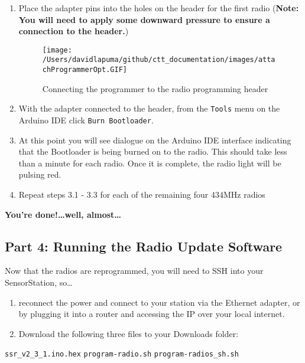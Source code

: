 \documentclass[
]{article}
\begin{document}
\begin{enumerate}
\def\labelenumi{\arabic{enumi}.}
\item
  Place the adapter pins into the holes on the header for the first
  radio (\textbf{Note: You will need to apply some downward pressure to
  ensure a connection to the header.})

  \begin{figure}
  \hypertarget{id}{%
  \centering
  \texttt{[image: /Users/davidlapuma/github/ctt\_documentation/images/attachProgrammerOpt.GIF]}
  \caption{Connecting the programmer to the radio programming
  header}\label{id}
  }
  \end{figure}
\item
  With the adapter connected to the header, from the \texttt{Tools} menu
  on the Arduino IDE click \texttt{Burn\ Bootloader}.
\item
  At this point you will see dialogue on the Arduino IDE interface
  indicating that the Bootloader is being burned on to the radio. This
  should take less than a minute for each radio. Once it is complete,
  the radio light will be pulsing red.
\item
  Repeat steps 3.1 - 3.3 for each of the remaining four 434MHz radios
\end{enumerate}

\textbf{You're done!\ldots well, almost\ldots{}}

\hypertarget{part-4-running-the-radio-update-software}{%
\subsection{Part 4: Running the Radio Update
Software}\label{part-4-running-the-radio-update-software}}

Now that the radios are reprogrammed, you will need to SSH into your
SensorStation, so\ldots{}

\begin{enumerate}
\def\labelenumi{\arabic{enumi}.}
\item
  reconnect the power and connect to your station via the Ethernet
  adapter, or by plugging it into a router and accessing the IP over
  your local internet.
\item
  Download the following three files to your Downloads folder:
\end{enumerate}

\texttt{ssr\_v2\_3\_1.ino.hex} \texttt{program-radio.sh}
\texttt{program-radios\_sh.sh}
\end{document}
